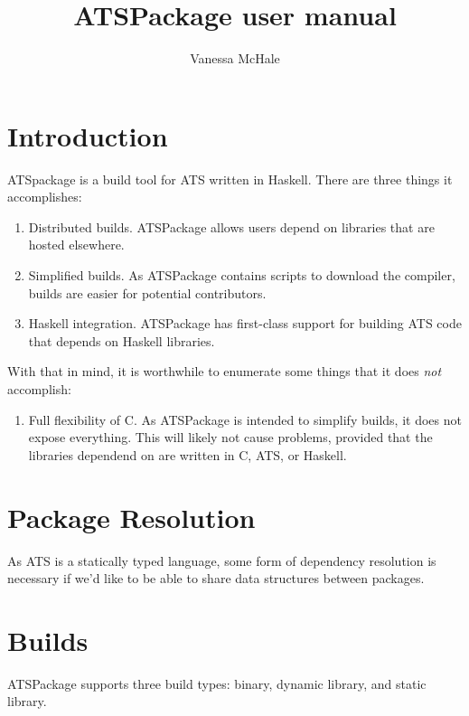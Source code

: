 \documentclass{article}
\begin{document}
\title{ATSPackage user manual}
\author{Vanessa McHale}
\maketitle

\tableofcontents

\section{Introduction}

ATSpackage is a build tool for ATS written in Haskell. There are three
things it accomplishes:

\begin{enumerate}
  \item Distributed builds. ATSPackage allows users depend on libraries that are
    hosted elsewhere.
  \item Simplified builds. As ATSPackage contains scripts to download the
    compiler, builds are easier for potential contributors.
  \item Haskell integration. ATSPackage has first-class support for building ATS
    code that depends on Haskell libraries. 
\end{enumerate}

With that in mind, it is worthwhile to enumerate some things that it does
\textit{not} accomplish:

\begin{enumerate}
  \item Full flexibility of C. As ATSPackage is intended to simplify builds, it
    does not expose everything. This will likely not cause problems, provided
    that the libraries dependend on are written in C, ATS, or Haskell.
\end{enumerate}

\section{Package Resolution}

As ATS is a statically typed language, some form of dependency resolution is
necessary if we'd like to be able to share data structures between packages.

\section{Builds}

ATSPackage supports three build types: binary, dynamic library, and static
library.
\end{document}
